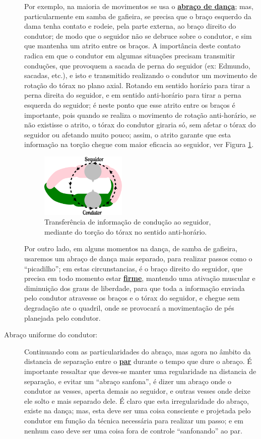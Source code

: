 \begin{description}
Por exemplo, na maioria de movimentos se usa o \hyperref[def:abracodedanca]{\textbf{abraço de dança}};
mas, particularmente em samba de gafieira, se precisa que o braço esquerdo da dama tenha contato
e rodeie, pela parte externa, ao braço direito do condutor; 
de modo  que o seguidor não se debruce sobre o condutor,
e sim que mantenha um atrito entre os braços.
A importância deste contato radica em que o condutor em algumas situações precisam transmitir conduções, 
que provoquem a sacada de perna do seguidor (ex: Edmundo, sacadas, etc.), 
e isto e transmitido realizando o condutor um movimento de rotação do tórax no plano axial.  
Rotando em sentido horário para tirar a perna direita do seguidor, 
e em sentido anti-horário para tirar a perna esquerda do seguidor;
é neste ponto que esse atrito entre os braços é importante, 
pois quando se realiza o movimento de rotação anti-horário, se não existisse o atrito,
o tórax do condutor giraria só, sem afetar o tórax do seguidor ou afetando muito pouco;
assim, o atrito garante que esta informação na torção chegue com maior eficacia ao seguidor,
ver Figura \ref{fig:torcao-abraco}.
\begin{figure}[h]
  \centering
    \includegraphics[width=0.4\textwidth]{chapters/cap-normas/torcao-abraco.eps}
\caption{Transferência de informação de condução ao seguidor, mediante do torção do tórax no sentido anti-horário.}
\label{fig:torcao-abraco}
\end{figure}

Por outro lado, em alguns momentos na dança, de samba de gafieira, usaremos um abraço de dança mais separado,
para realizar passos como o ``picadilho''; em estas circunstancias, é o braço direito do seguidor,
que precisa em todo momento estar \hyperref[def:brazosfirmes]{\textbf{firme}}, 
mantendo uma ativação muscular e diminuição dos graus de liberdade,
para que toda a informação enviada pelo condutor atravesse os braços e o tórax do seguidor,
e chegue sem degradação ate o quadril, onde se provocará a movimentação de pés planejada pelo condutor.

\item[Abraço uniforme do condutor:] Continuando com as particularidades do abraço,
mas agora no âmbito da distancia de separação entre o \hyperref[def:Par]{\textbf{par}} durante o tempo que dure o abraço.
É importante ressaltar que deves-se manter uma regularidade na distancia de separação,
e evitar um ``abraço sanfona'', é dizer um abraço onde o condutor as vesses, 
aperta demais ao seguidor, e outras vesses onde deixe ele solto e mais separado dele.
É claro que esta irregularidade do abraço, existe na dança; 
mas, esta deve ser uma coisa consciente e projetada 
pelo condutor em função da técnica necessária para realizar um passo; 
e em nenhum caso deve ser uma coisa  fora de controle ``sanfonando'' ao par.


\end{description}
